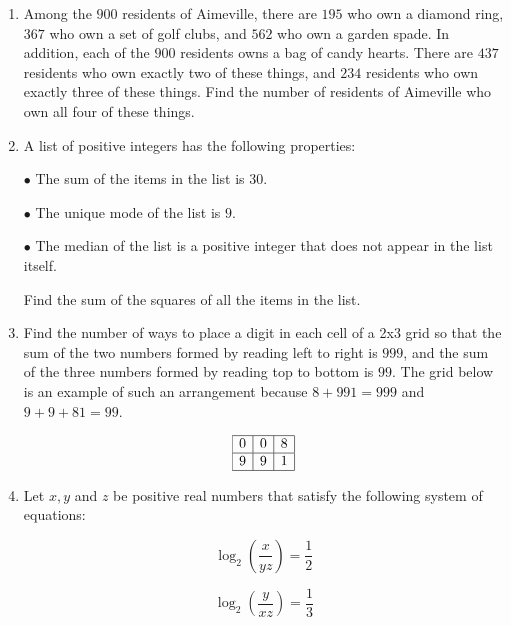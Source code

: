 \documentclass{article}
\begin{document}
\begin{enumerate}[label=\arabic*., itemsep=0.5em]
\item Among the \(900\) residents of Aimeville, there are \(195\) who own a diamond ring, \(367\) who own a set of golf clubs, and \(562\) who own a garden spade. In addition, each of the \(900\) residents owns a bag of candy hearts. There are \(437\) residents who own exactly two of these things, and \(234\) residents who own exactly three of these things. Find the number of residents of Aimeville who own all four of these things.\par \vspace{0.5em}\item A list of positive integers has the following properties:

\(\bullet\) The sum of the items in the list is \(30\).

\(\bullet\) The unique mode of the list is \(9\).

\(\bullet\) The median of the list is a positive integer that does not appear in the list itself.

Find the sum of the squares of all the items in the list.\par \vspace{0.5em}\item Find the number of ways to place a digit in each cell of a 2x3 grid so that the sum of the two numbers formed by reading left to right is \(999\), and the sum of the three numbers formed by reading top to bottom is \(99\). The grid below is an example of such an arrangement because \(8+991=999\) and \(9+9+81=99\).


\begin{equation*}
\begin{array}{|c|c|c|} \hline
0 & 0 & 8 \\ \hline
9 & 9 & 1 \\ \hline
\end{array}
\end{equation*}
\par \vspace{0.5em}\item Let \(x,y\) and \(z\) be positive real numbers that satisfy the following system of equations:

\begin{equation*}
\log_2\left(\frac{x }{ yz}\right) = \frac{1 }{ 2}
\end{equation*}

\begin{equation*}
\log_2\left(\frac{y }{ xz}\right) = \frac{1 }{ 3}
\end{equation*}


\end{enumerate}
\end{document}
